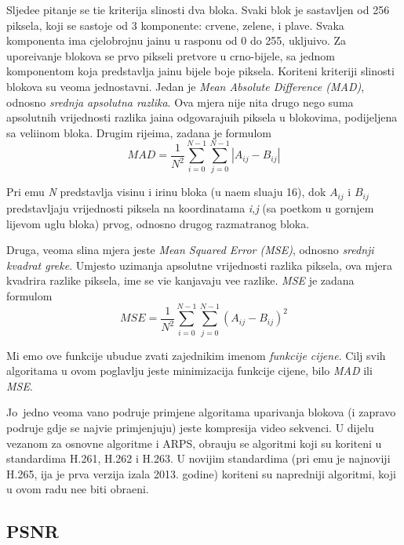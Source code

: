 Sljede\cj e pitanje se ti\ch e kriterija sli\ch nosti dva bloka. Svaki blok je sastavljen od 256 piksela, koji se sastoje od 3 komponente: crvene, zelene, i plave. Svaka komponenta ima cjelobrojnu ja\ch inu u rasponu od 0 do 255, uklju\ch ivo.
Za upore\dj ivanje blokova se prvo pikseli pretvore u crno-bijele, sa jednom komponentom koja predstavlja ja\ch inu bijele boje piksela.
Kori\sh teni kriteriji sli\ch nosti blokova su veoma jednostavni. Jedan je  \textit{Mean Absolute Difference (MAD)}, odnosno \textit{srednja apsolutna razlika}. Ova mjera nije ni\sh ta drugo nego suma apsolutnih vrijednosti razlika
ja\ch ina odgovaraju\cj ih piksela u blokovima, podijeljena sa veli\ch inom bloka. Drugim rije\ch ima, zadana je formulom
$$
MAD = \frac{1}{N^2}\sum_{i=0}^{N-1}\sum_{j=0}^{N-1}|A_{ij}-B_{ij}|
$$

Pri \ch emu \textit{N} predstavlja visinu i \sh irinu bloka (u na\sh em slu\ch aju 16), dok $A_{ij}$ i $B_{ij}$ predstavljaju vrijednosti piksela na koordinatama \textit{i,j} (sa po\ch etkom u gornjem lijevom uglu bloka) prvog,
odnosno drugog razmatranog bloka. 

Druga, veoma sli\ch na mjera jeste \textit{Mean Squared Error (MSE)}, odnosno \textit{srednji kvadrat gre\sh ke}. Umjesto uzimanja apsolutne vrijednosti razlika piksela, ova mjera kvadrira razlike piksela, \ch ime se vi\sh e
ka\zh njavaju ve\cj e razlike. \textit{MSE} je zadana formulom
$$
MSE = \frac{1}{N^2}\sum_{i=0}^{N-1}\sum_{j=0}^{N-1}(A_{ij}-B_{ij})^2
$$

Mi \cj emo ove funkcije ubudu\cj e zvati zajedni\ch kim imenom \textit{funkcije cijene}. Cilj svih algoritama u ovom poglavlju jeste minimizacija funkcije cijene, bilo \textit{MAD} ili \textit{MSE}.

Jo\sh\ jedno veoma va\zh no podru\ch je primjene algoritama uparivanja blokova (i zapravo podru\ch je gdje se najvi\sh e primjenjuju) jeste kompresija video sekvenci. U dijelu vezanom za osnovne algoritme i ARPS,
obra\dj uju se algoritmi koji su kori\sh teni u standardima H.261, H.262 i H.263. U novijim standardima (pri \ch emu je najnoviji H.265, \ch ija je prva verzija iza\sh la 2013. godine) kori\sh teni su napredniji algoritmi, koji u
ovom radu ne\cj e biti obra\dj eni.

\subsection{PSNR}

